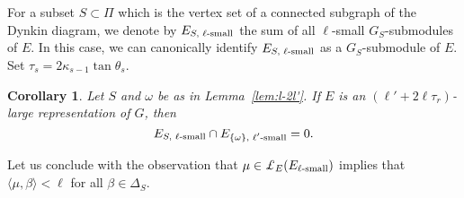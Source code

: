 \documentclass{amsart}
\theoremstyle{plain}
\newtheorem{corollary}[theorem]{Corollary}
\theoremstyle{definition}
\theoremstyle{remark}
\begin{document}
For a subset $S \subset \Pi$ which is the vertex set of a connected subgraph of the
Dynkin diagram, we denote by $E_{S, \textup{ $\ell$-small}}$
the sum of all $\ell$-small $G_{S}$-submodules of $E$. In this case, we can canonically
identify $E_{S, \textup{ $\ell$-small}}$ as a $G_{S}$-submodule of $E$.
Set $\tau_{s} = 2 \kappa_{s - 1} \tan \theta_{s}$.

\begin{corollary}\label{cor:longOmegaChain}
Let $S$ and $\omega$ be as in Lemma~\ref{lem:l-2l'}. If $E$ is an
$(\ell' + 2 \ell \tau_{r})$-large representation of $G$, then
$$E_{S, \textup{ $\ell$-small}} \cap E_{\{\omega\}, \textup{ $\ell'$-small}} = 0.$$
\end{corollary}

Let us conclude with the observation that $\mu \in \pounds_{E}
(E_{\textup{$\ell$-small}})$ implies that $\langle \mu, \beta
\rangle < \ell$ for all $\beta \in \Delta_{S}$.
\end{document}
